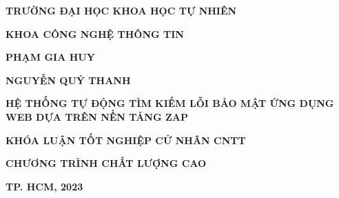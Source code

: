 \begin{center}

    \textbf{\large TRƯỜNG ĐẠI HỌC KHOA HỌC TỰ NHIÊN}
    
    \textbf{\large KHOA CÔNG NGHỆ THÔNG TIN }
    
    \vspace{2.5cm}
    
    \textbf{\large PHẠM GIA HUY}
    
    \textbf{\large NGUYỄN QUÝ THANH}
    
    \vspace{3cm}
    
    \textbf{\large HỆ THỐNG TỰ ĐỘNG TÌM KIẾM LỖI BẢO MẬT ỨNG DỤNG WEB DỰA TRÊN NỀN TẢNG ZAP }
    
    \vspace{3cm}
    
    \textbf{\large KHÓA LUẬN TỐT NGHIỆP CỬ NHÂN CNTT}

    \textbf{\large CHƯƠNG TRÌNH CHẤT LƯỢNG CAO}
    
    \vspace{7.5cm}
    
    \textbf{\large TP. HCM, 2023 }
\end{center}


    

    